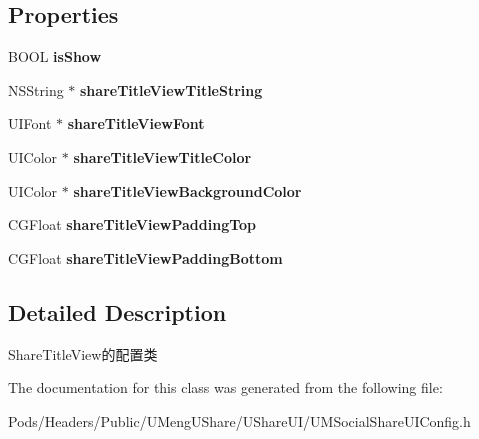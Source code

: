 \subsection*{Properties}
\begin{DoxyCompactItemize}
\item 
\mbox{\label{interface_u_m_social_share_title_view_config_ae8c4e1f4be2bfeafe7fec1eafaf3d189}} 
B\+O\+OL {\bfseries is\+Show}
\item 
\mbox{\label{interface_u_m_social_share_title_view_config_abcda0d702c4cb2a37da56e1cb5c0c3b9}} 
N\+S\+String $\ast$ {\bfseries share\+Title\+View\+Title\+String}
\item 
\mbox{\label{interface_u_m_social_share_title_view_config_ad83a12a1c570f699f55bc4238a915355}} 
U\+I\+Font $\ast$ {\bfseries share\+Title\+View\+Font}
\item 
\mbox{\label{interface_u_m_social_share_title_view_config_af6a59f363be51a4079c0d7461691919f}} 
U\+I\+Color $\ast$ {\bfseries share\+Title\+View\+Title\+Color}
\item 
\mbox{\label{interface_u_m_social_share_title_view_config_a313cba9ffd53f3981b6e134547cd61f5}} 
U\+I\+Color $\ast$ {\bfseries share\+Title\+View\+Background\+Color}
\item 
\mbox{\label{interface_u_m_social_share_title_view_config_a1baa5db21b733e53abde60002542e201}} 
C\+G\+Float {\bfseries share\+Title\+View\+Padding\+Top}
\item 
\mbox{\label{interface_u_m_social_share_title_view_config_a01808d52aa52670a0fda0b0b0b2f2efd}} 
C\+G\+Float {\bfseries share\+Title\+View\+Padding\+Bottom}
\end{DoxyCompactItemize}


\subsection{Detailed Description}
Share\+Title\+View的配置类 

The documentation for this class was generated from the following file\+:\begin{DoxyCompactItemize}
\item 
Pods/\+Headers/\+Public/\+U\+Meng\+U\+Share/\+U\+Share\+U\+I/U\+M\+Social\+Share\+U\+I\+Config.\+h\end{DoxyCompactItemize}
